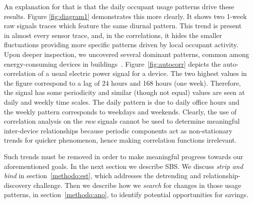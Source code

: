An explanation for that is that the daily occupant usage patterns %
drive these results.
Figure \ref{fig:diagram1} demonstrates this more clearly.  It shows two 1-week raw signals traces which feature the same 
diurnal pattern.  
This trend is present in almost every sensor trace, and, in the correlations, it hides 
the smaller fluctuations providing more specific patterns driven by local occupant activity.  Upon deeper inspection, we uncovered several
 dominant patterns, common among energy-consuming devices in buildings~\cite{wrinch:pes2012}.  Figure~\ref{fig:autocorr} depicts the 
 auto-correlation of a usual electric power signal for a device.  The two highest values in the figure correspond to a lag of 24 hours and 168 hours (one week).  
 Therefore, the signal has some periodicity and similar (though not equal) values are seen at daily and weekly time scales.
The daily pattern is due to daily office hours and the weekly pattern corresponds to weekdays and weekends.  
Clearly, the use of correlation analysis on the \emph{raw} signals cannot be used to determine meaningful 
inter-device relationships because periodic components act as non-stationary trends for quicker phenomenon, hence making correlation functions irrelevant.  %

Such trends must be removed in order to make meaningful progress towards our aforementioned goals.  In the next section
we describe SBS.  We discuss \emph{strip and bind} in section~\ref{methodo:est}, which addresses the detrending and
relationship-discovery challenge.  Then we describe how we \emph{search} for changes in those usage patterns, 
in section~\ref{methodo:ano}, to identify potential opportunities for savings.

